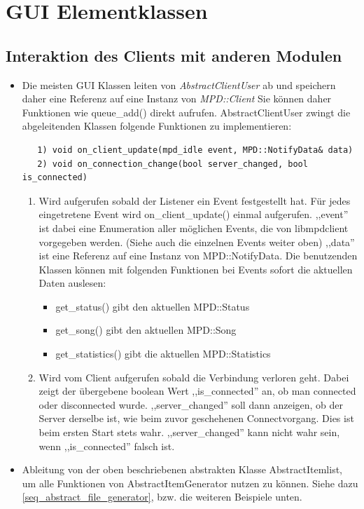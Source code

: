 \newpage
\section{GUI Elementklassen}
\subsection{Interaktion des Clients mit anderen Modulen}
\begin{itemize}
\item Die meisten GUI Klassen leiten von \emph{AbstractClientUser} ab und speichern daher eine Referenz auf eine Instanz von \emph{MPD::Client}
      Sie können daher Funktionen wie queue\_add() direkt aufrufen.
      AbstractClientUser zwingt die abgeleitenden Klassen folgende Funktionen zu implementieren: 
\begin{verbatim} 
   1) void on_client_update(mpd_idle event, MPD::NotifyData& data)
   2) void on_connection_change(bool server_changed, bool is_connected)
\end{verbatim}
   \begin{enumerate}
   \item Wird aufgerufen sobald der Listener ein Event festgestellt hat. Für jedes eingetretene Event wird on\_client\_update()    
   einmal aufgerufen. ,,event'' ist dabei eine Enumeration aller möglichen Events, die von libmpdclient 
   vorgegeben werden. (Siehe auch die einzelnen Events weiter oben)
   ,,data'' ist eine Referenz auf eine Instanz von MPD::NotifyData. Die benutzenden Klassen können mit folgenden Funktionen bei Events sofort die aktuellen Daten auslesen:
   \begin{itemize} 
     \item get\_status() gibt den aktuellen MPD::Status
     \item get\_song() gibt den aktuellen MPD::Song
     \item get\_statistics() gibt die aktuellen MPD::Statistics
   \end{itemize} 
   \item Wird vom Client aufgerufen sobald die Verbindung verloren geht.
         Dabei zeigt der übergebene boolean Wert ,,is\_connected'' an, ob man connected oder disconnected wurde.
         ,,server\_changed'' soll dann anzeigen, ob der Server derselbe ist, wie beim zuvor geschehenen Connectvorgang.
         Dies ist beim ersten Start stets wahr. ,,server\_changed'' kann nicht wahr sein, wenn ,,is\_connected'' falsch ist.
   \end{enumerate}
\item Ableitung von der oben beschriebenen abstrakten Klasse AbstractItemlist, um alle Funktionen von AbstractItemGenerator nutzen zu können. Siehe dazu \ref{seq_abstract_file_generator}, bzw. die weiteren Beispiele unten.

\end{itemize}
